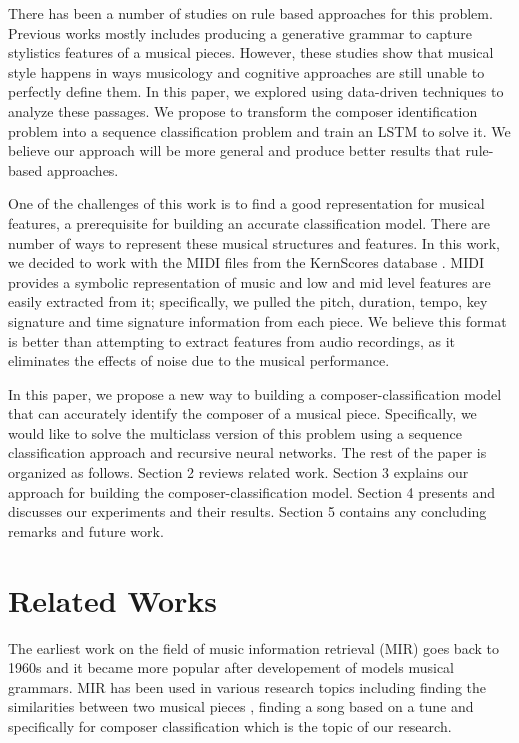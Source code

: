 \documentclass[11pt,a4paper]{article}
\begin{document}
There has been a number of studies on rule based approaches for this problem. Previous works mostly includes producing a generative grammar to capture stylistics features of a musical pieces. However, these studies show that musical style happens in ways musicology and cognitive approaches are still unable to perfectly define them. In this paper, we explored using  data-driven techniques to analyze these passages. We propose to transform the composer identification problem into a sequence classification problem and train an LSTM to solve it.  We believe our approach will be more general and produce better results that rule-based approaches.

One of the challenges of this work is to find a good representation for musical features, a prerequisite for building an accurate classification model. There are number of ways to represent these musical structures and features.  In this work, we decided to work with the MIDI files from the KernScores database \cite{Kern}. MIDI provides a symbolic representation of music and low and mid level features are easily extracted from it; specifically, we pulled the pitch, duration, tempo, key signature and time signature information from each piece. We believe this format is better than attempting to extract features from audio recordings, as it eliminates the effects of noise due to the musical performance.

In this paper, we propose a new way to building a composer-classification model that can accurately identify the composer of a musical piece. Specifically, we would like to solve the multiclass version of this problem using a sequence classification approach and recursive neural networks. The rest of the paper is organized as follows. Section 2 reviews related work. Section 3 explains our approach for building the composer-classification model. Section 4 presents and discusses our experiments and their results. Section 5 contains any concluding remarks and future work.


\section{Related Works}

The earliest work on the field of music information retrieval (MIR) goes back to 1960s \cite {Kassler} and it became more popular after developement of models musical grammars. MIR has been used in various research topics including finding the similarities between two musical pieces \cite{Berenzweig}, finding a song based on a tune \cite {Ghias} and specifically for composer classification which is the topic of our research.
\end{document}

